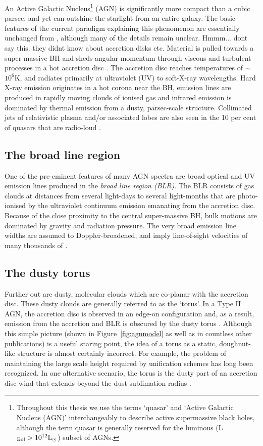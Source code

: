 An Active Galactic Nucleus\footnote{Throughout this thesis we use the terms `quasar' and `Active Galactic Nucleus (AGN)' interchangeably to describe active supermassive black holes, although the term quasar is generally reserved for the luminous (L$_{\rm Bol} > 10^{12}{\rm L}_{\odot}$) subset of AGNs.} (AGN) is significantly more compact than a cubic parsec, and yet can outshine the starlight from an entire galaxy. 
The basic features of the current paradigm explaining this phenomenon are essentially unchanged from \citet{salpeter64}, although many of the details remain unclear.
Hmmm... dont say this. they didnt know about accretion disks etc. 
Material is pulled towards a super-massive BH and sheds angular momentum through viscous and turbulent processes in a hot accretion disc \citep[e.g.][]{begelman85}. 
The accretion disc reaches temperatures of $\sim$$10^6$K, and radiates primarily at ultraviolet (UV) to soft-X-ray wavelengths. 
Hard X-ray emission originates in a hot corona near the BH, emission lines are produced in rapidly moving clouds of ionised gas and infrared emission is dominated by thermal emission from a dusty, parsec-scale structure. 
Collimated jets of relativistic plasma and/or associated lobes are also seen in the 10 per cent of quasars that are radio-loud \citep[e.g.][]{peterson97}. 

\subsection{The broad line region}

One of the pre-eminent features of many AGN spectra are broad optical and UV emission lines produced in the {\em broad line region (BLR)}. 
The BLR consists of gas clouds at distances from several light-days to several light-months that are photo-ionised by the ultraviolet continuum emission emanating from the accretion disc.  
Because of the close proximity to the central super-massive BH, bulk motions are dominated by gravity and radiation pressure.
The very broad emission line widths are assumed to Doppler-broadened, and imply line-of-sight velocities of many thousands of \kms. 

\subsection{The dusty torus}

Further out are dusty, molecular clouds which are co-planar with the accretion disc. 
These dusty clouds are generally referred to as the `torus'. 
In a Type II AGN, the accretion disc is observed in an edge-on configuration and, as a result, emission from the accretion and BLR is obscured by the dusty torus \citep[e.g.][]{antonucci93}.
Although this simple picture (shown in Figure~\ref{fig:agnmodel} as well as in countless other publications) is a useful staring point, the idea of a torus as a static, doughnut-like structure is almost certainly incorrect. 
For example, the problem of maintaining the large scale height required by unification schemes has long been recognized. 
In one alternative scenario, the torus is the dusty part of an accretion disc wind that extends beyond the dust-sublimation radius \citep[e.g.][]{konigl94,everett09,gallagher12,everett05,keating12,elitzur06}. 

